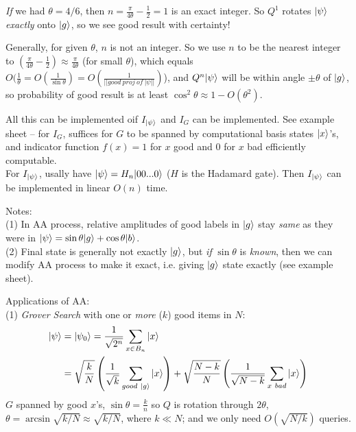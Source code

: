 \documentclass[a4paper]{article}
\begin{document}
\begin{eg}
    \emph{If} we had $\theta =4/6$, then $n=\frac{\pi}{4\theta} - \frac{1}{2} = 1$ is an exact integer. So $Q^1$ rotates $|\psi\rangle$ \emph{exactly} onto $|g\rangle$, so we see good result with certainty!
\end{eg}

Generally, for given $\theta$, $n$ is not an integer. So we use $n$ to be the nearest integer to $(\frac{\pi}{4\theta} - \frac{1}{2}) \approx \frac{\pi}{4\theta}$ (for small $\theta$), which equals $O(\frac{1}{\theta} = O(\frac{1}{\sin\theta}) = O(\frac{1}{||good\ proj\ of\ |\psi||})$), and $Q^n|\psi\rangle$ will be within angle $\pm \theta$ of $|g\rangle$, so probability of good result is at least $\cos^2\theta \approx 1-O(\theta^2)$.

All this can be implemented oif $I_{|\psi\rangle}$ and $I_G$ can be implemented. See example sheet -- for $I_G$, suffices for $G$ to be spanned by computational basis states $|x\rangle$'s, and indicator function $f(x)=1$ for $x$ good and $0$ for $x$ bad efficiently computable.\\
For $I_{|\psi\rangle}$, usally have $|\psi\rangle =H_n|00...0\rangle$ ($H$ is the Hadamard gate). Then $I_{|\psi\rangle}$ can be implemented in linear $O(n)$ time.

Notes:\\
(1) In AA process, relative amplitudes of good labels in $|g\rangle$ stay \emph{same} as they were in $|\psi\rangle = \sin\theta|g\rangle + \cos\theta |b\rangle$.\\
(2) Final state is generally not exactly $|g\rangle$, but \emph{if} $\sin\theta$ is \emph{known}, then we can modify AA process to make it exact, i.e. giving $|g\rangle$ state exactly (see example sheet).

Applications of AA:\\
(1) \emph{Grover Search} with one or \emph{more} ($k$) good items in $N$:\\
\begin{equation*}
    \begin{aligned}
        |\psi\ket &= |\psi_0\ket = \frac{1}{\sqrt{2^n}} \sum_{x \in B_n} |x\ket\\
        &= \sqrt{\frac{k}{N}} \left(\frac{1}{\sqrt{k}} \sum_{good\ |g\ket} |x\ket\right) + \sqrt{\frac{N-k}{N}} \left(\frac{1}{\sqrt{N-k}} \sum_{x\ bad}|x\ket\right)
    \end{aligned}
\end{equation*}
$G$ spanned by good $x$'s, $\sin\theta = \frac{k}{n}$ so $Q$ is rotation through $2\theta$, $\theta=\arcsin\sqrt{k/N} \approx \sqrt{k/N}$, where $k\ll N$; and we only need $O(\sqrt{N/k})$ queries.
\end{document}
